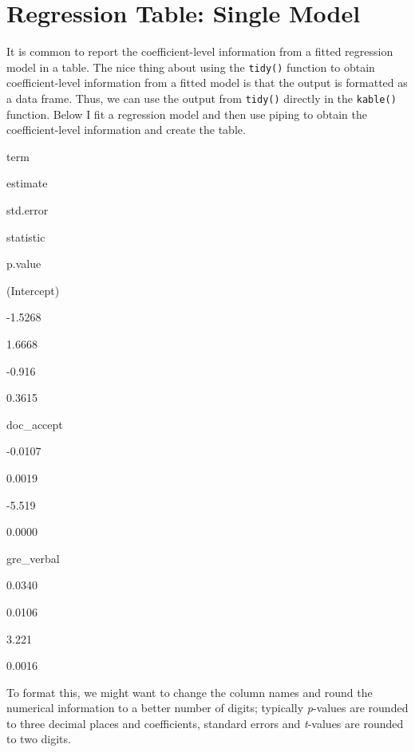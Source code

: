 \documentclass[]{book}
\newenvironment{Shaded}{\begin{snugshade}}{\end{snugshade}}
\newcommand{\DataTypeTok}[1]{\textcolor[rgb]{0.13,0.29,0.53}{#1}}
\newcommand{\DecValTok}[1]{\textcolor[rgb]{0.00,0.00,0.81}{#1}}
\newcommand{\KeywordTok}[1]{\textcolor[rgb]{0.13,0.29,0.53}{\textbf{#1}}}
\newcommand{\NormalTok}[1]{#1}
\newcommand{\OperatorTok}[1]{\textcolor[rgb]{0.81,0.36,0.00}{\textbf{#1}}}
\newcommand{\StringTok}[1]{\textcolor[rgb]{0.31,0.60,0.02}{#1}}
\begin{document}
\hypertarget{regression-table-single-model}{%
\section*{Regression Table: Single Model}\label{regression-table-single-model}}

It is common to report the coefficient-level information from a fitted regression model in a table. The nice thing about using the \texttt{tidy()} function to obtain coefficient-level information from a fitted model is that the output is formatted as a data frame. Thus, we can use the output from \texttt{tidy()} directly in the \texttt{kable()} function. Below I fit a regression model and then use piping to obtain the coefficient-level information and create the table.

\begin{Shaded}
\end{Shaded}

term

estimate

std.error

statistic

p.value

(Intercept)

-1.5268

1.6668

-0.916

0.3615

doc\_accept

-0.0107

0.0019

-5.519

0.0000

gre\_verbal

0.0340

0.0106

3.221

0.0016

To format this, we might want to change the column names and round the numerical information to a better number of digits; typically \emph{p}-values are rounded to three decimal places and coefficients, standard errors and \emph{t}-values are rounded to two digits.
\end{document}
